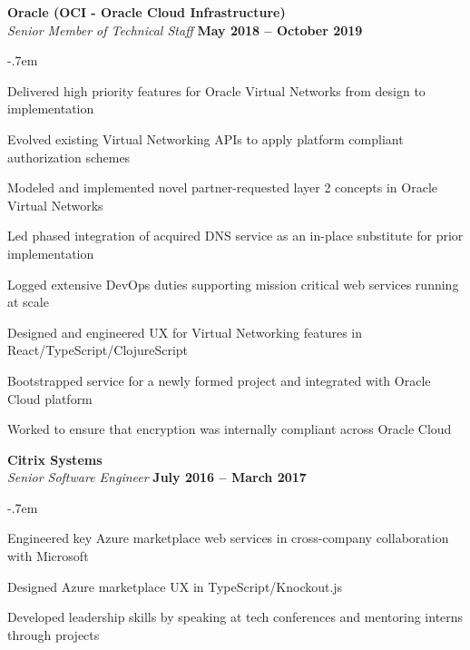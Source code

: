 \documentclass[margin,line]{resume}
\begin{document}
\begin{resume}
    \textbf{\listing Oracle (OCI - Oracle Cloud Infrastructure)} \vspace{2mm}\\\vspace{0mm}%
    \textsl{Senior Member of Technical Staff} \hfill \textbf{May 2018 -- October 2019}\\
    \begin{list2}
    \itemsep-.7em
    \item Delivered high priority features for Oracle Virtual Networks from design to implementation\\
    \item Evolved existing Virtual Networking APIs to apply platform compliant authorization schemes\\
    \item Modeled and implemented novel partner-requested layer 2 concepts in Oracle Virtual Networks\\
    \item Led phased integration of acquired DNS service as an in-place substitute for prior implementation\\
    \item Logged extensive DevOps duties supporting mission critical web services running at scale\\
    \item Designed and engineered UX for Virtual Networking features in React/TypeScript/ClojureScript\\
    \item Bootstrapped service for a newly formed project and integrated with Oracle Cloud platform\\
    \item Worked to ensure that encryption was internally compliant across Oracle Cloud
    \end{list2}

    \textbf{\listing Citrix Systems} \vspace{2mm}\\\vspace{0mm}%
    \textsl{Senior Software Engineer} \hfill \textbf{July 2016 -- March 2017}\\
    \begin{list2}
    \itemsep-.7em
    \item Engineered key Azure marketplace web services in cross-company collaboration with Microsoft\\
    \item Designed Azure marketplace UX in TypeScript/Knockout.js\\
    \item Developed leadership skills by speaking at tech conferences and mentoring interns through projects
    \end{list2}


\end{resume}
\end{document}
